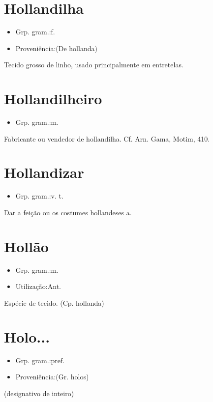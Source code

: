 \documentclass{article}
\begin{document}
\section{Hollandilha}
\begin{itemize}
\item {Grp. gram.:f.}
\end{itemize}
\begin{itemize}
\item {Proveniência:(De \textunderscore hollanda\textunderscore )}
\end{itemize}
Tecido grosso de linho, usado principalmente em entretelas.
\section{Hollandilheiro}
\begin{itemize}
\item {Grp. gram.:m.}
\end{itemize}
Fabricante ou vendedor de hollandilha. Cf. Arn. Gama, \textunderscore Motim\textunderscore , 410.
\section{Hollandizar}
\begin{itemize}
\item {Grp. gram.:v. t.}
\end{itemize}
Dar a feição ou os costumes hollandeses a.
\section{Hollão}
\begin{itemize}
\item {Grp. gram.:m.}
\end{itemize}
\begin{itemize}
\item {Utilização:Ant.}
\end{itemize}
Espécie de tecido.
(Cp. \textunderscore hollanda\textunderscore )
\section{Holo...}
\begin{itemize}
\item {Grp. gram.:pref.}
\end{itemize}
\begin{itemize}
\item {Proveniência:(Gr. \textunderscore holos\textunderscore )}
\end{itemize}
(designativo de \textunderscore inteiro\textunderscore )
\end{document}
